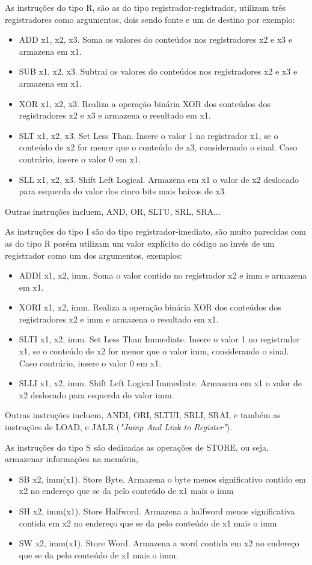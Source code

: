 		As instruções do tipo R, são as do tipo registrador-registrador, utilizam três registradores como argumentos, dois sendo fonte e um de destino por exemplo:
		\begin{itemize}
			\item{ADD x1, x2, x3. Soma os valores do conteúdos nos registradores x2 e x3 e armazena em x1.}
			\item{SUB x1, x2, x3. Subtrai os valores do conteúdos nos registradores x2 e x3 e armazena em x1.}
			\item{XOR x1, x2, x3. Realiza a operação binária XOR dos conteúdos dos registradores x2 e x3 e armazena o resultado em x1.}
			\item{SLT x1, x2, x3. Set Less Than. Insere o valor 1 no registrador x1, se o conteúdo de x2 for menor que o conteúdo de x3, considerando o sinal. Caso contrário, insere o valor 0 em x1.}
			\item{SLL x1, x2, x3. Shift Left Logical. Armazena em x1 o valor de x2 deslocado para esquerda do valor dos cinco bits mais baixos de x3.}				
		\end{itemize}
		Outras instruções incluem, AND, OR, SLTU, SRL, SRA...

		As instruções do tipo I são do tipo registrador-imediato, são muito parecidas com as do tipo R porém utilizam um valor explícito do código ao invés de um registrador como um dos argumentos, exemplos:
		\begin{itemize}
			\item{ADDI x1, x2, imm. Soma o valor contido no registrador x2 e imm e armazena em x1.}
			\item{XORI x1, x2, imm. Realiza a operação binária XOR dos conteúdos dos registradores x2 e imm e armazena o resultado em x1.}
			\item{SLTI x1, x2, imm. Set Less Than Immediate. Insere o valor 1 no registrador x1, se o conteúdo de x2 for menor que o valor imm, considerando o sinal. Caso contrário, insere o valor 0 em x1.}
			\item{SLLI x1, x2, imm. Shift Left Logical Immediate. Armazena em x1 o valor de x2 deslocado para esquerda do valor imm.}
		\end{itemize}
		Outras instruções incluem, ANDI, ORI, SLTUI, SRLI, SRAI, e também as instruções de LOAD, e JALR (\textit{"Jump And Link to Register"}).

		As instruções do tipo S são dedicadas as operações de STORE, ou seja, armazenar informações na memória,
		\begin{itemize}
			\item{SB x2, imm(x1). Store Byte. Armazena o byte menos significativo contido em x2 no endereço que se da pelo conteúdo de x1 mais o imm}
			\item{SH x2, imm(x1). Store Halfword. Armazena a halfword menos significativa contida em x2 no endereço que se da pelo conteúdo de x1 mais o imm}
			\item{SW x2, imm(x1). Store Word. Armazena a word contida em x2 no endereço que se da pelo conteúdo de x1 mais o imm.}
		\end{itemize}


